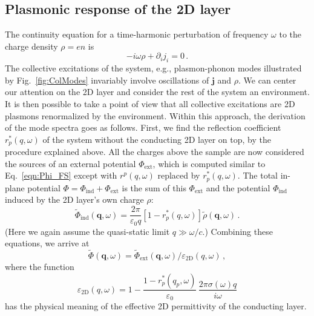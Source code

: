 \documentclass[aps, prb, reprint, superscriptaddress]{revtex4-2}
\renewcommand{\vec}{\mathbf}
\begin{document}
\subsection{Plasmonic response of the 2D layer}
\label{ssec:CCR}

The continuity equation for a time-harmonic perturbation of frequency $\omega$ to the charge density $\rho = en $ is
\begin{equation}
	-i \omega \rho + \partial_i j_i  = 0\,.
	\label{eqn:Charge_cont}
\end{equation}
The collective excitations of the system, e.g., plasmon-phonon modes illustrated by Fig.~\ref{fig:ColModes} invariably involve oscillations of $\vec{j}$ and $\rho$.
We can center our attention on the 2D layer and consider the rest of the system an environment.
It is then possible to take a point of view that
all collective excitations are 2D plasmons renormalized by the environment.
Within this approach, the derivation of the mode spectra goes as follows. 
First, we find the reflection coefficient $r_p^*(q, \omega)$ of the system without the conducting 2D layer on top, by the procedure explained above.
All the charges above the sample are now considered the sources of an external potential
$\Phi_\mathrm{ext}$, which is computed similar to
Eq.~\eqref{eqn:Phi_FS} except with $r^p(q, \omega)$ replaced by $r_p^*(q, \omega)$.
The total in-plane potential $\Phi = \Phi_\mathrm{ind} + \Phi_\mathrm{ext}$ is the sum of this $\Phi_\mathrm{ext}$ and
the potential $\Phi_\mathrm{ind}$ induced by the 2D layer's own charge $\rho$:
\begin{equation}
	\tilde\Phi_\mathrm{ind}(\vec{q}, \omega) =
	\frac{2\pi}{\varepsilon_0 q}[1 - r_p^*(q, \omega)] \tilde\rho(\vec{q}, \omega)\,.
	\label{eqn:Gauss}
\end{equation}
(Here we again assume the quasi-static limit $q \gg \omega / c$.)
Combining these equations, we arrive at
\begin{equation}
	\tilde\Phi(\vec{q}, \omega) = {\tilde\Phi_\mathrm{ext}(\vec{q}, \omega)} / {\varepsilon_\mathrm{2D}(q,\omega)}\,,
	\label{eqn:Phi_Phi_Phi}
\end{equation}
where the function
\begin{equation}
	\varepsilon_\mathrm{2D}(q, \omega) = 1 - 
	\frac{1 - r_p^*(q_p, \omega)}{\varepsilon_0}\,
	\frac{2\pi \sigma(\omega) q}{i\omega} 
	\label{eqn:epsilon_2D}
\end{equation}
has the physical meaning of the effective 2D permittivity of the conducting layer.
\end{document}
